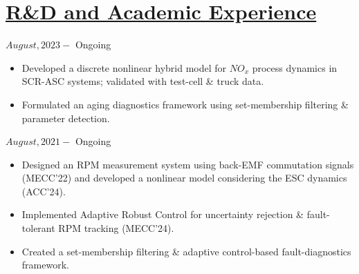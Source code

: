 \section*{\underline{R\&D and Academic Experience}}
\noindent {} \hfill $August, 2023 - $ Ongoing
\begin{itemize}
        \item Developed a discrete nonlinear hybrid model for $NO_x$ process dynamics in SCR-ASC systems; validated with test-cell \& truck data.
        \item Formulated an aging diagnostics framework using set-membership filtering \& parameter detection.
\end{itemize}

\medskip

\noindent {} \hfill $August, 2021 - $ Ongoing
\begin{itemize}
        \item Designed an RPM measurement system using back-EMF commutation signals (MECC'22) and developed a nonlinear model considering the ESC dynamics (ACC'24).
        \item Implemented Adaptive Robust Control for uncertainty rejection \& fault-tolerant RPM tracking (MECC'24).
        \item Created a set-membership filtering \& adaptive control-based fault-diagnostics framework.
\end{itemize}

\medskip

